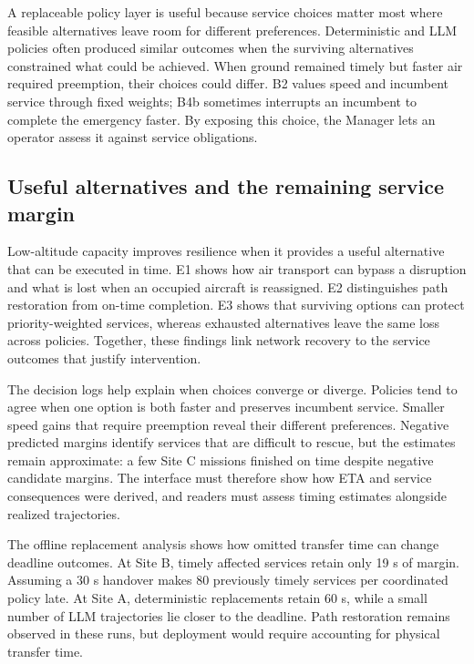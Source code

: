\documentclass[]{interact}
\theoremstyle{plain}
\theoremstyle{definition}
\theoremstyle{remark}
\begin{document}
A replaceable policy layer is useful because service choices matter most where feasible alternatives leave room for different preferences. Deterministic and LLM policies often produced similar outcomes when the surviving alternatives constrained what could be achieved. When ground remained timely but faster air required preemption, their choices could differ. B2 values speed and incumbent service through fixed weights; B4b sometimes interrupts an incumbent to complete the emergency faster. By exposing this choice, the Manager lets an operator assess it against service obligations.

\subsection{Useful alternatives and the remaining service margin}

Low-altitude capacity improves resilience when it provides a useful alternative that can be executed in time. E1 shows how air transport can bypass a disruption and what is lost when an occupied aircraft is reassigned. E2 distinguishes path restoration from on-time completion. E3 shows that surviving options can protect priority-weighted services, whereas exhausted alternatives leave the same loss across policies. Together, these findings link network recovery to the service outcomes that justify intervention. \citep{ref1,ref3}

The decision logs help explain when choices converge or diverge. Policies tend to agree when one option is both faster and preserves incumbent service. Smaller speed gains that require preemption reveal their different preferences. Negative predicted margins identify services that are difficult to rescue, but the estimates remain approximate: a few Site C missions finished on time despite negative candidate margins. The interface must therefore show how ETA and service consequences were derived, and readers must assess timing estimates alongside realized trajectories.

The offline replacement analysis shows how omitted transfer time can change deadline outcomes. At Site B, timely affected services retain only 19 s of margin. Assuming a 30 s handover makes 80 previously timely services per coordinated policy late. At Site A, deterministic replacements retain 60 s, while a small number of LLM trajectories lie closer to the deadline. Path restoration remains observed in these runs, but deployment would require accounting for physical transfer time.
\end{document}
